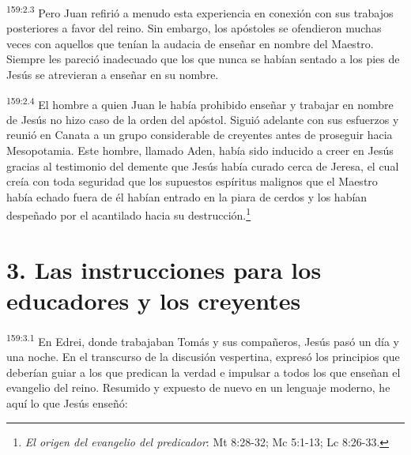 \par
\textsuperscript{159:2.3} Pero Juan refirió a menudo esta experiencia en conexión con sus trabajos posteriores a favor del reino. Sin embargo, los apóstoles se ofendieron muchas veces con aquellos que tenían la audacia de enseñar en nombre del Maestro. Siempre les pareció inadecuado que los que nunca se habían sentado a los pies de Jesús se atrevieran a enseñar en su nombre.

\par
\textsuperscript{159:2.4} El hombre a quien Juan le había prohibido enseñar y trabajar en nombre de Jesús no hizo caso de la orden del apóstol. Siguió adelante con sus esfuerzos y reunió en Canata a un grupo considerable de creyentes antes de proseguir hacia Mesopotamia. Este hombre, llamado Aden, había sido inducido a creer en Jesús gracias al testimonio del demente que Jesús había curado cerca de Jeresa, el cual creía con toda seguridad que los supuestos espíritus malignos que el Maestro había echado fuera de él habían entrado en la piara de cerdos y los habían despeñado por el acantilado hacia su destrucción.\footnote{\textit{El origen del evangelio del predicador}: Mt 8:28-32; Mc 5:1-13; Lc 8:26-33.}

\section*{3. Las instrucciones para los educadores y los creyentes}
\par
\textsuperscript{159:3.1} En Edrei, donde trabajaban Tomás y sus compañeros, Jesús pasó un día y una noche. En el transcurso de la discusión vespertina, expresó los principios que deberían guiar a los que predican la verdad e impulsar a todos los que enseñan el evangelio del reino. Resumido y expuesto de nuevo en un lenguaje moderno, he aquí lo que Jesús enseñó:

